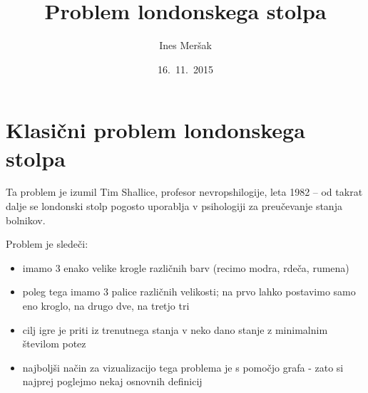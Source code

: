 \documentclass[11pt]{article}
\title{Problem londonskega stolpa}
\author{Ines Meršak}
\date{16.~11.~2015}
\theoremstyle{definition} %
\theoremstyle{plain} %
\begin{document}
\maketitle


\section{Klasični problem londonskega stolpa}
Ta problem je izumil Tim Shallice, profesor nevropshilogije, leta 1982 -- od takrat dalje se londonski stolp pogosto uporablja v psihologiji za preučevanje stanja bolnikov.

Problem je sledeči:
\begin{itemize}
    \item imamo 3 enako velike krogle različnih barv (recimo modra, rdeča, rumena)
    \item poleg tega imamo 3 palice različnih velikosti; na prvo lahko postavimo samo eno kroglo, na drugo dve, na tretjo tri
    \item cilj igre je priti iz trenutnega stanja v neko dano stanje z minimalnim številom potez
    \item najboljši način za vizualizacijo tega problema je s pomočjo grafa - zato si najprej poglejmo nekaj osnovnih definicij
\end{itemize}
\end{document}
